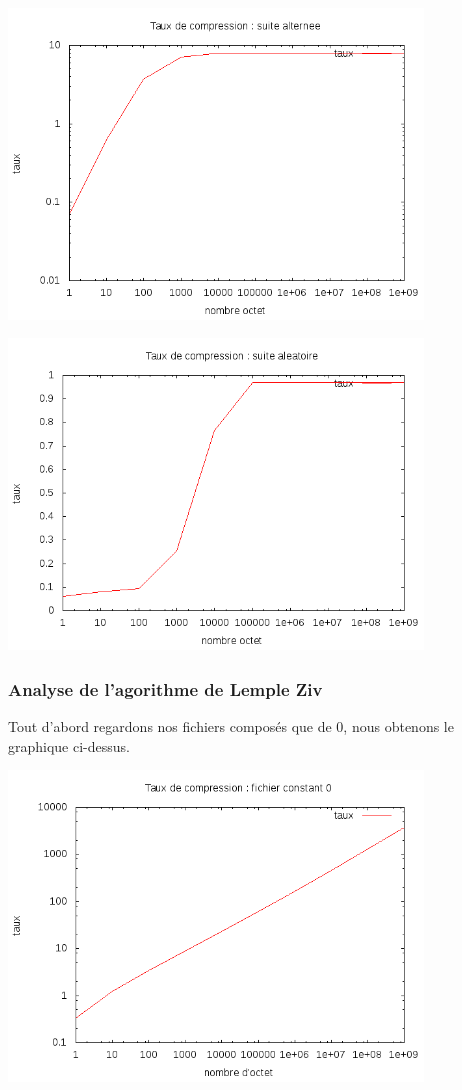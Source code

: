\documentclass{report}
\begin{document}
\begin{center}
\includegraphics[width=11cm]{alternerH.png}
\end{center}

\begin{center}
\includegraphics[width=11cm]{aleaH.png}
\end{center}


\subsubsection{ Analyse de l'agorithme de Lemple Ziv}

Tout d'abord regardons nos fichiers composés que de 0, nous obtenons le graphique ci-dessus.
\begin{center}

\includegraphics[width=11cm]{LZConstant.png}

\end{center}
\end{document}
